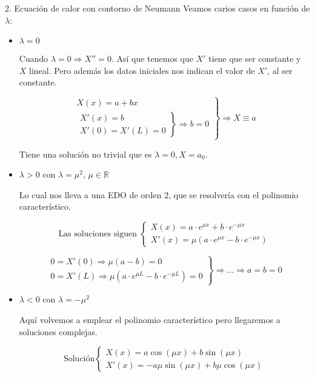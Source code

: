 \begin{example}{2. Ecuación de calor con contorno de Neumann}
		Veamos carios casos en función de $\lambda$:

		\begin{itemize}
			\item $\lambda = 0$

				Cuando $\lambda = 0 \Rightarrow X'' = 0$. Así que tenemos que $X'$ tiene que ser constante y $X$ lineal. Pero además los datos iniciales nos indican el valor de $X'$, al ser constante.

				\[ \left.
				\begin{array}{l}
					X(x) = a + bx \\
					\left.
					\begin{array}{r}
						X'(x) = b \\
						X'(0) = X'(L) = 0
					\end{array} \right\} \Rightarrow b = 0
				\end{array} \right\} \Rightarrow X \equiv a \]

				Tiene una solución no trivial que es $\lambda = 0, X=a_0$.

			\item $\lambda > 0$ con $\lambda = \mu^2$, $\mu \in \mathbb{R}$

				Lo cual nos lleva a una EDO de orden 2, que se resolvería con el polinomio característico.

				\[ \text{Las soluciones siguen } \left\{
				   \begin{array}{l}
				   	X(x) = a \cdot e^{\mu x} + b \cdot e^{-\mu x} \\
				   	X'(x) = \mu (a\cdot e^{\mu x} - b\cdot e^{-\mu x})
				   \end{array} \right.
				\]

				\[ \left. \begin{array}{l}
					0 = X'(0) \Rightarrow \mu(a - b) = 0 \\
					0 = X'(L) \Rightarrow \mu(a \cdot e^{\mu L} - b \cdot e^{-\mu L}) = 0
				\end{array} \right\}
					\Rightarrow … \Rightarrow a = b = 0
				\]


			\item $\lambda < 0$ con $\lambda = - \mu^2$

				Aquí volvemos a emplear el polinomio característico pero llegaremos a soluciones complejas.

			 	\[ \text{Solución} \left\{
				   \begin{array}{l}
				   	X(x) = a \cos(\mu x ) + b \sin( \mu x) \\
				   	X'(x) = -a \mu \sin(\mu x) + b \mu \cos(\mu x)
				   \end{array} \right.
				\]


\end{itemize}
\end{example}
